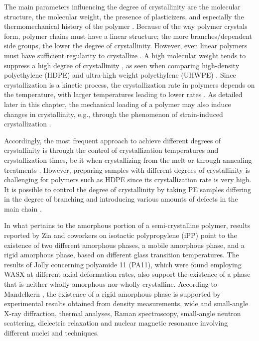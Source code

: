 The main parameters influencing the degree of crystallinity are the molecular structure, the molecular weight, the presence of plasticizers, and especially the thermomechanical history of the polymer \citep{khouryMorphologyCrystallineSynthetic1976, cangemiTwoPhaseModelMechanical2001}.
Because of the way polymer crystals form, polymer chains must have a linear structure; the more branches/dependent side groups, the lower the degree of crystallinity.
However, even linear polymers must have sufficient regularity to crystallize \citep{khouryMorphologyCrystallineSynthetic1976}.
A high molecular weight tends to suppress a high degree of crystallinity \citep{hoffmanAnalysisRelaxationsPolychlorotrifluoroethylene2007}, as seen when comparing high-density polyethylene (HDPE) and ultra-high weight polyethylene (UHWPE) \citep{brownInfluenceMolecularConformation2007}.
Since crystallization is a kinetic process, the crystallization rate in polymers depends on the temperature, with larger temperatures leading to lower rates \citep{callister2014materials}.
As detailed later in this chapter, the mechanical loading of a polymer may also induce changes in crystallinity, e.g., through the phenomenon of strain-induced crystallization \citep{raoStudyStraininducedCrystallization2001}.

Accordingly, the most frequent approach to achieve different degrees of crystallinity is through the control of crystallization temperatures and crystallization times, be it when crystallizing from the melt or through annealing treatments \citep{fakirovGlassTransitionTemperature2000, schrauwenIntrinsicDeformationBehavior2004}.
However, preparing samples with different degrees of crystallinity is challenging for polymers such as HDPE since its crystallization rate is very high.
It is possible to control the degree of crystallinity by taking PE samples differing in the degree of branching and introducing various amounts of defects in the main chain \citep{fakirovGlassTransitionTemperature2000}.

In what pertains to the amorphous portion of a semi-crystalline polymer, results reported by Zia and coworkers \citep{ziaRigidAmorphousFraction2008} on isotactic polypropylene (iPP) point to the existence of two different amorphous phases, a mobile amorphous phase, and a rigid amorphous phase, based on different glass transition temperatures.
The results of Jolly \citep{jollyAnalyseMicrostructurePolyamide2000} concerning polyamide 11 (PA11), which were found employing WASX at different axial deformation rates, also support the existence of a phase that is neither wholly amorphous nor wholly crystalline.
According to Mandelkern \citep{mandelkernCrystallinePolymerReminiscences2006}, the existence of a rigid amorphous phase is supported by experimental results obtained from density measurements, wide and small-angle X-ray diffraction, thermal analyses, Raman spectroscopy, small-angle neutron scattering, dielectric relaxation and nuclear magnetic resonance involving different nuclei and techniques.

